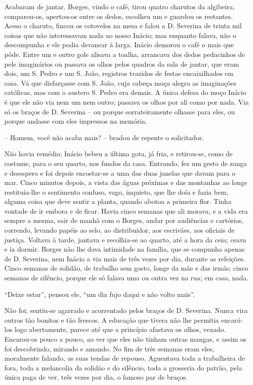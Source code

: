 Acabaram de jantar. Borges, vindo o café, tirou quatro charutos da
algibeira, comparou-os, apertou-os entre os dedos, escolheu um e guardou
os restantes. Aceso o charuto, fincou os cotovelos na mesa e falou a D.
Severina de trinta mil coisas que não interessavam nada ao nosso Inácio;
mas enquanto falava, não o descompunha e ele podia devanear à larga.
Inácio demorou o café o mais que pôde. Entre um e outro gole alisava a
toalha, arrancava dos dedos pedacinhos de pele imaginários ou passava os
olhos pelos quadros da sala de jantar, que eram dois, um S. Pedro e um
S. João, registros trazidos de festas encaixilhados em casa. Vá que
disfarçasse com S. João, cuja cabeça moça alegra as imaginações
católicas, mas com o austero S. Pedro era demais. A única defesa do moço
Inácio é que ele não via nem um nem outro; passava os olhos por ali como
por nada. Via só os braços de D. Severina -- ou porque sorrateiramente
olhasse para eles, ou porque andasse com eles impressos na memória.

-- Homem, você não acaba mais? -- bradou de repente o solicitador.

Não havia remédio; Inácio bebeu a última gota, já fria, e retirou-se,
como de costume, para o seu quarto, nos fundos da casa. Entrando, fez um
gesto de zanga e desespero e foi depois encostar-se a uma das duas
janelas que davam para o mar. Cinco minutos depois, a vista das águas
próximas e das montanhas ao longe restituía-lhe o sentimento confuso,
vago, inquieto, que lhe doía e fazia bem, alguma coisa que deve sentir a
planta, quando abotoa a primeira flor. Tinha vontade de ir embora e de
ficar. Havia cinco semanas que ali morava, e a vida era sempre a mesma,
sair de manhã com o Borges, andar por audiências e cartórios, correndo,
levando papéis ao selo, ao distribuidor, aos escrivães, aos oficiais de
justiça. Voltava à tarde, jantava e recolhia-se ao quarto, até a hora da
ceia; ceava e ia dormir. Borges não lhe dava intimidade na família, que
se compunha apenas de D. Severina, nem Inácio a via mais de três vezes
por dia, durante as refeições. Cinco semanas de solidão, de trabalho sem
gosto, longe da mãe e das irmãs; cinco semanas de silêncio, porque ele
só falava uma ou outra vez na rua; em casa, nada.

``Deixe estar'', pensou ele, ``um dia fujo daqui e não volto mais''.

Não foi; sentiu-se agarrado e acorrentado pelos braços de D. Severina.
Nunca vira outros tão bonitos e tão frescos. A educação que tivera não
lhe permitia encará-los logo abertamente, parece até que a princípio
afastava os olhos, vexado. Encarou-os pouco a pouco, ao ver que eles não
tinham outras mangas, e assim os foi descobrindo, mirando e amando. No
fim de três semanas eram eles, moralmente falando, as suas tendas de
repouso. Aguentava toda a trabalheira de fora, toda a melancolia da
solidão e do silêncio, toda a grosseria do patrão, pela única paga de
ver, três vezes por dia, o famoso par de braços.

